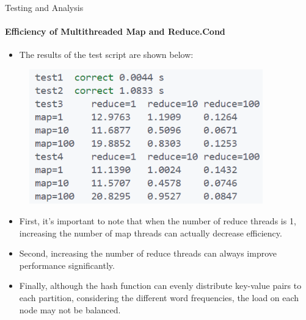 \documentclass[10pt]{beamer}
\begin{document}
\begin{frame}[fragile]{Testing and Analysis}
    \framesubtitle{Efficiency of Multithreaded Map and Reduce.Cond}
    \begin{minipage}{.40\linewidth}
        \begin{itemize}
            \item The results of the test script are shown below:
        \end{itemize}
        \begin{figure}
            \centering
            \includegraphics[width=0.9\textwidth]{figures/test_output.png}
        \end{figure}
    \end{minipage}
    \begin{minipage}{.59\linewidth}
        \begin{itemize}
            \item First, it's important to note that when the number of reduce threads is 1, increasing the number of map threads can actually decrease efficiency.
            \item Second, increasing the number of reduce threads can always improve performance significantly.
            \item Finally, although the hash function can evenly distribute key-value pairs to each partition, considering the different word frequencies, the load on each node may not be balanced.
        \end{itemize}
    \end{minipage}
\end{frame}
\end{document}
